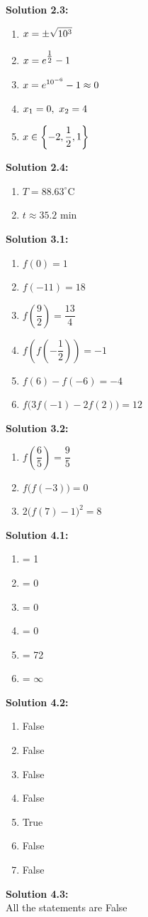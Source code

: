 \documentclass{article}
\newcommand{\solution}[2][]{%
  \par\noindent\textbf{Solution #1:\\} #2\par \vspace*{.25cm}
}
\begin{document}
\solution[2.3]{
  \begin{enumerate}[label=\alph*.]
    \item $\displaystyle x = \pm \sqrt{10^3}$
    \item $\displaystyle x = e^{\tfrac{1}{2}}-1$
    \item $\displaystyle x = e^{10^{-6}}-1 \approx 0$
    \item $\displaystyle x_1 = 0,\ x_2 = 4$
    \item $\displaystyle x \in \left\{-2, \dfrac{1}{2}, 1\right\}$
  \end{enumerate}
}

\solution[2.4]{
  \begin{enumerate}[label=\alph*.]
    \item $T = 88.63^\circ$C
    \item $t \approx 35.2$ min
  \end{enumerate}
}

\solution[3.1]{
  \begin{enumerate}[label=\alph*.]
    \item $f(0) = 1$
    \item $f(-11)=18$
    \item $f\left(\dfrac{9}{2}\right) = \dfrac{13}{4}$
    \item $f\left(f\left(-\dfrac{1}{2}\right)\right) = -1$
    \item $f(6) - f(-6) = -4$
    \item $f\big(3f(-1)-2f(2)\big) = 12$
  \end{enumerate}
}

\solution[3.2]{
  \begin{enumerate}[label=\alph*.]
    \item $f\left(\dfrac{6}{5}\right) = \dfrac{9}{5}$
    \item $f\big(f(-3)\big) = 0$
    \item $2\big(f(7)-1\big)^2=8$
  \end{enumerate}
}

\solution[4.1]{
  \begin{enumerate}[label=\alph*.]
    \item = 1
    \item = 0
    \item = 0
    \item = 0
    \item = 72
    \item = $\infty$
  \end{enumerate}
}

\solution[4.2]{
  \begin{enumerate}[label=\alph*.]
    \item False
    \item False
    \item False
    \item False
    \item True
    \item False
    \item False
  \end{enumerate}
}

\solution[4.3]{
  All the statements are False
}
\end{document}
